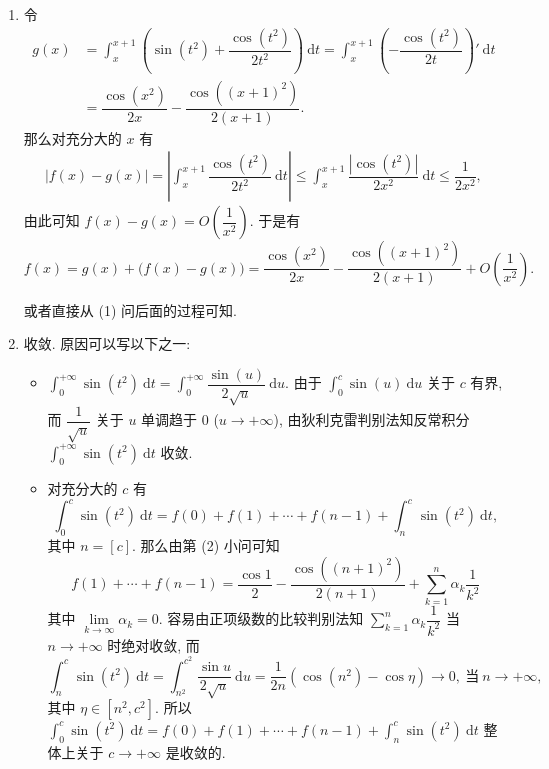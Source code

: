 \begin{solution}
\begin{enumerate}
\item 令
\begin{align*}
g(x) & = \int_x^{x+1} \left( \sin(t^2) + \dfrac{\cos(t^2)}{2t^2} \right) ~ \mathrm{d}t = \int_x^{x+1} \left( - \dfrac{\cos(t^2)}{2t} \right)' ~ \mathrm{d}t \\
& = \dfrac{\cos(x^2)}{2x} - \dfrac{\cos((x+1)^2)}{2(x+1)}.
\end{align*}
那么对充分大的 $x$ 有
\begin{align*}
\left| f(x) - g(x) \right| = \left| \int_x^{x+1} \dfrac{\cos(t^2)}{2t^2} ~ \mathrm{d}t \right| \leqslant \int_x^{x+1} \dfrac{\left| \cos(t^2) \right|}{2x^2} ~ \mathrm{d}t \leqslant \dfrac{1}{2x^2},
\end{align*}
由此可知 $\displaystyle f(x) - g(x) = O \left( \dfrac{1}{x^2} \right).$ 于是有
$$f(x) = g(x) + \big(f(x) - g(x)\big) = \dfrac{\cos(x^2)}{2x} - \dfrac{\cos((x+1)^2)}{2(x+1)} + O \left( \dfrac{1}{x^2} \right).$$

或者直接从 (1) 问后面的过程可知.

\item 收敛. 原因可以写以下之一:
\begin{itemize}
\item[\ding{43}] $\displaystyle \int_0^{+\infty} \sin(t^2) ~ \mathrm{d}t = \int_0^{+\infty} \dfrac{\sin(u)}{2\sqrt{u}} ~ \mathrm{d}u.$ 由于 $\displaystyle \int_0^c \sin(u) ~ \mathrm{d}u$ 关于 $c$ 有界, 而 $\dfrac{1}{\sqrt{u}}$ 关于 $u$ 单调趋于 $0$ ($u \to + \infty$), 由狄利克雷判别法知反常积分 $\displaystyle \int_0^{+\infty} \sin(t^2) ~ \mathrm{d}t$ 收敛.

\item[\ding{43}] 对充分大的 $c$ 有
$$\int_0^c \sin(t^2) ~ \mathrm{d}t = f(0) + f(1) + \cdots + f(n-1) + \int_n^c \sin(t^2) ~ \mathrm{d}t,$$
其中 $n = [c].$ 那么由第 (2) 小问可知
\begin{equation*}
f(1) + \cdots + f(n-1) = \dfrac{\cos 1}{2} - \dfrac{\cos((n+1)^2)}{2(n+1)} + \sum_{k=1}^n \alpha_k \dfrac{1}{k^2}
\end{equation*}
其中 $\lim\limits_{k \to \infty} \alpha_k = 0.$ 容易由正项级数的比较判别法知 $\sum\limits_{k=1}^n \alpha_k \dfrac{1}{k^2}$ 当 $n \to +\infty$ 时绝对收敛, 而
\begin{equation*}
\int_n^c \sin(t^2) ~ \mathrm{d}t = \int_{n^2}^{c^2} \dfrac{\sin u}{2\sqrt{u}} ~ \mathrm{d} u = \dfrac{1}{2n} ( \cos (n^2) - \cos \eta) \to 0, ~ \text{当} ~ n \to +\infty,
\end{equation*}
其中 $\eta \in [n^2, c^2].$ 所以 $\displaystyle \int_0^c \sin(t^2) ~ \mathrm{d}t = f(0) + f(1) + \cdots + f(n-1) + \int_n^c \sin(t^2) ~ \mathrm{d}t$ 整体上关于 $c \to +\infty$ 是收敛的.
\end{itemize}
\end{enumerate}
\end{solution}


